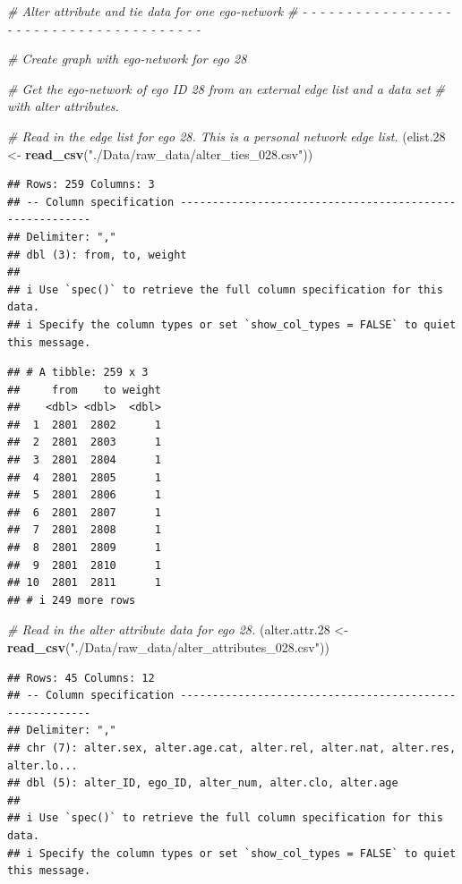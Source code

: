 \documentclass[
]{book}
\newenvironment{Shaded}{\begin{snugshade}}{\end{snugshade}}
\newcommand{\CommentTok}[1]{\textcolor[rgb]{0.56,0.35,0.01}{\textit{#1}}}
\newcommand{\FloatTok}[1]{\textcolor[rgb]{0.00,0.00,0.81}{#1}}
\newcommand{\FunctionTok}[1]{\textcolor[rgb]{0.13,0.29,0.53}{\textbf{#1}}}
\newcommand{\NormalTok}[1]{#1}
\newcommand{\OtherTok}[1]{\textcolor[rgb]{0.56,0.35,0.01}{#1}}
\newcommand{\StringTok}[1]{\textcolor[rgb]{0.31,0.60,0.02}{#1}}
\begin{document}
\begin{Shaded}
\begin{Highlighting}[]
\CommentTok{\# Alter attribute and tie data for one ego{-}network}
\CommentTok{\# {-} {-} {-} {-} {-} {-} {-} {-} {-} {-} {-} {-} {-} {-} {-} {-} {-} {-} {-} {-} {-} {-} {-} {-} {-} {-} {-} {-} {-} {-} {-} {-} {-} {-} {-} {-} {-} {-} {-}}

\CommentTok{\# Create graph with ego{-}network for ego 28}

\CommentTok{\# Get the ego{-}network of ego ID 28 from an external edge list and a data set}
\CommentTok{\# with alter attributes.}

\CommentTok{\# Read in the edge list for ego 28. This is a personal network edge list.}
\NormalTok{(elist}\FloatTok{.28} \OtherTok{\textless{}{-}} \FunctionTok{read\_csv}\NormalTok{(}\StringTok{"./Data/raw\_data/alter\_ties\_028.csv"}\NormalTok{))}
\end{Highlighting}
\end{Shaded}

\begin{verbatim}
## Rows: 259 Columns: 3
## -- Column specification --------------------------------------------------------
## Delimiter: ","
## dbl (3): from, to, weight
## 
## i Use `spec()` to retrieve the full column specification for this data.
## i Specify the column types or set `show_col_types = FALSE` to quiet this message.
\end{verbatim}

\begin{verbatim}
## # A tibble: 259 x 3
##     from    to weight
##    <dbl> <dbl>  <dbl>
##  1  2801  2802      1
##  2  2801  2803      1
##  3  2801  2804      1
##  4  2801  2805      1
##  5  2801  2806      1
##  6  2801  2807      1
##  7  2801  2808      1
##  8  2801  2809      1
##  9  2801  2810      1
## 10  2801  2811      1
## # i 249 more rows
\end{verbatim}

\begin{Shaded}
\begin{Highlighting}[]
\CommentTok{\# Read in the alter attribute data for ego 28. }
\NormalTok{(alter.attr}\FloatTok{.28} \OtherTok{\textless{}{-}} \FunctionTok{read\_csv}\NormalTok{(}\StringTok{"./Data/raw\_data/alter\_attributes\_028.csv"}\NormalTok{))}
\end{Highlighting}
\end{Shaded}

\begin{verbatim}
## Rows: 45 Columns: 12
## -- Column specification --------------------------------------------------------
## Delimiter: ","
## chr (7): alter.sex, alter.age.cat, alter.rel, alter.nat, alter.res, alter.lo...
## dbl (5): alter_ID, ego_ID, alter_num, alter.clo, alter.age
## 
## i Use `spec()` to retrieve the full column specification for this data.
## i Specify the column types or set `show_col_types = FALSE` to quiet this message.
\end{verbatim}
\end{document}
